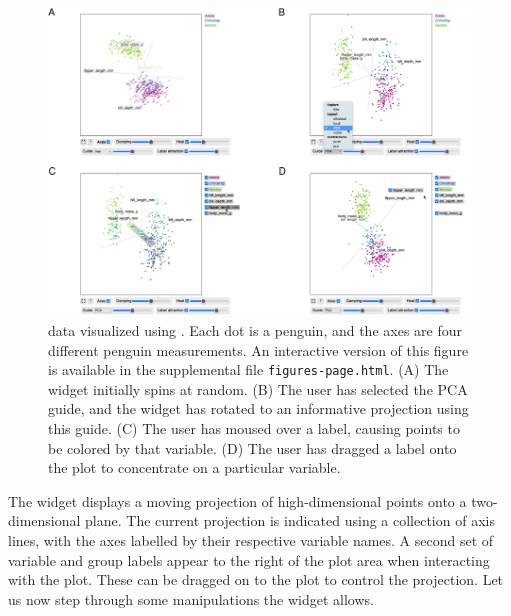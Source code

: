 \begin{figure}
\centering
\includegraphics{langevitour-article_files/figure-latex/penguins-1.pdf}
\caption{\label{fig:penguins} data visualized using . Each dot is a penguin, and the axes are four different penguin measurements. An interactive version of this figure is available in the supplemental file \texttt{figures-page.html}. (A) The widget initially spins at random. (B) The user has selected the PCA guide, and the widget has rotated to an informative projection using this guide. (C) The user has moused over a label, causing points to be colored by that variable. (D) The user has dragged a label onto the plot to concentrate on a particular variable.}
\end{figure}

The widget displays a moving projection of high-dimensional points onto a two-dimensional plane. The current projection is indicated using a collection of axis lines, with the axes labelled by their respective variable names. A second set of variable and group labels appear to the right of the plot area when interacting with the plot. These can be dragged on to the plot to control the projection. Let us now step through some manipulations the  widget allows.

